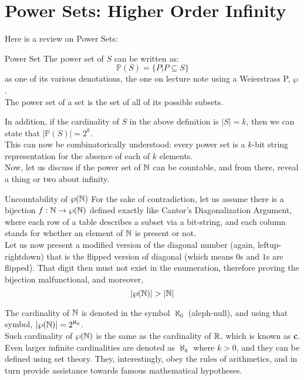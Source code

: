 \section{Power Sets: Higher Order Infinity}
Here is a review on Power Sets:
\begin{ln-define}{Power Set}{}
    The power set of $S$ can be written as:
    \[\mathbb{P} (S) = \{P | P \subseteq S\}\]
    as one of its various denotations, the one on lecture note using a Weierstrass P, $\wp$. \\
    The power set of a set is the set of all of its possible subsets.
\end{ln-define}
In addition, if the cardinality of $S$ in the above definition is $|S| = k$, then we can state that $|\mathbb{P} (S)| = 2^k$. \\
This can now be combinatorically understood: every power set is a $k$-bit string representation for the absence of each of $k$ elements. \\
Now, let us discuss if the power set of $\mathbb{N}$ can be countable, and from there, reveal a thing or two about infinity.
\begin{ln-theorem}{Uncountability of $\wp(\mathbb{N})$}{}
    For the sake of contradiction, let us assume there is a bijection $f: \mathbb{N} \rightarrow \wp (\mathbb{N})$ defined exactly like Cantor's Diagonalization Argument, where each row of a table describes a subset via a bit-string, and each column stands for whether an element of $\mathbb{N}$ is present or not. \\
    Let us now present a modified version of the diagonal number (again, leftup-rightdown) that is the flipped version of diagonal (which means $0$s and $1$s are flipped). That digit then must not exist in the enumeration, therefore proving the bijection malfunctional, and moreover,
    \[|\wp(\mathbb{N})| > |\mathbb{N}|\]
\end{ln-theorem}
The cardinality of $\mathbb{N}$ is denoted in the symbol $\aleph_0$ (aleph-null), and using that symbol, $|\wp(\mathbb{N})| = 2^{\aleph_0}$. \\
Such cardinality of $\wp(\mathbb{N})$ is the same as the cardinality of $\mathbb{R}$, which is known as \textbf{c}. \\
Even larger infinite cardinalities are denoted as $\aleph_k$ where $k > 0$, and they can be defined using set theory. They, interestingly, obey the rules of arithmetics, and in turn provide assistance towards famous mathematical hypotheses.
